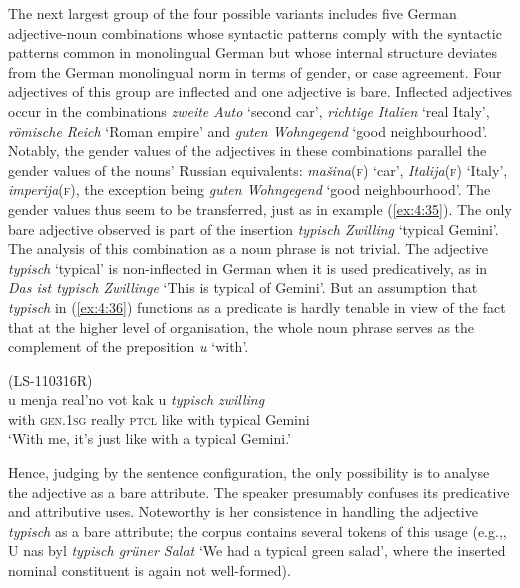 The next largest group of the four possible variants includes five German adjective-noun combinations whose syntactic patterns comply with the syntactic patterns common in monolingual German but whose internal structure deviates from the German monolingual norm in terms of gender, or case agreement. Four adjectives of this group are inflected and one adjective is bare. Inflected adjectives occur in the combinations \textit{zweite Auto} `second car', \textit{richtige Italien} `real Italy', \textit{römische Reich} `Roman empire' and \textit{guten Wohngegend} `good neighbourhood'. Notably, the gender values of the adjectives in these combinations parallel the gender values of the nouns' Russian equivalents: \textit{mašina}(\textsc{f}) `car', \textit{Italija}(\textsc{f}) `Italy', \textit{imperija}(\textsc{f}), the exception being \textit{guten Wohngegend} `good neighbourhood'. The gender values thus seem to be transferred, just as in example (\ref{ex:4:35}). The only bare adjective observed is part of the insertion \textit{typisch Zwilling} `typical Gemini'. The analysis of this combination as a noun phrase is not trivial. The adjective \textit{typisch} `typical' is non-inflected in German when it is used predicatively, as in \textit{Das ist typisch Zwillinge} `This is typical of Gemini'. But an assumption that \textit{typisch} in (\ref{ex:4:36}) functions as a predicate is hardly tenable in view of the fact that at the higher level of organisation, the whole noun phrase serves as the complement of the preposition \textit{u} `with'. 

\ea
\label{ex:4:36}
(LS-110316R)\\
 \gll u menja real'no vot kak u \textit{typisch} \textit{zwilling}\\
	with \textsc{gen.1sg} really \textsc{ptcl} like with typical Gemini\\
\glt `With me, it's just like with a typical Gemini.'
\z

\noindent  Hence, judging by the sentence configuration, the only possibility is to analyse the adjective as a bare attribute. The speaker presumably confuses its predicative and attributive uses. Noteworthy is her consistence in handling the adjective \textit{typisch} as a bare attribute; the corpus contains several tokens of this usage (e.g.,, U nas byl \textit{typisch grüner Salat} `We had a typical green salad', where the inserted nominal constituent is again not well-formed).

